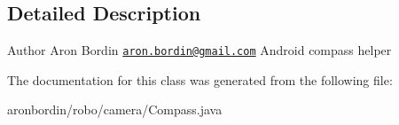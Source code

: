 \subsection{Detailed Description}
\begin{DoxyAuthor}{Author}
Aron Bordin \href{mailto:aron.bordin@gmail.com}{\tt aron.\+bordin@gmail.\+com} Android compass helper 
\end{DoxyAuthor}


The documentation for this class was generated from the following file\+:\begin{DoxyCompactItemize}
\item 
aronbordin/robo/camera/Compass.\+java\end{DoxyCompactItemize}
